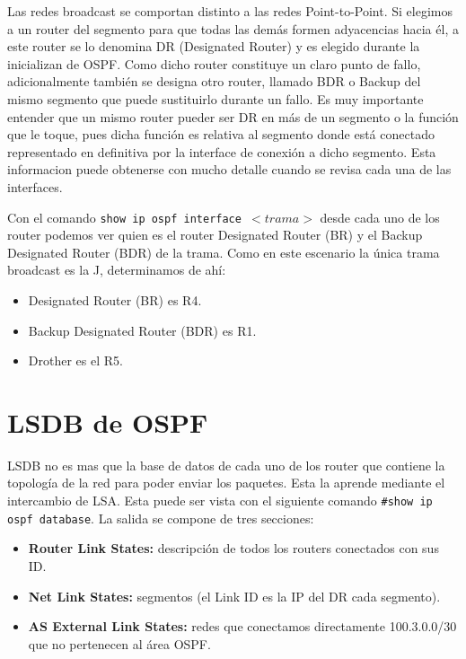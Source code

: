 \documentclass{article}
\begin{document}
Las redes broadcast se comportan distinto a las redes Point-to-Point. Si elegimos a un router del segmento para que todas las demás formen adyacencias hacia él, a este router se lo denomina DR (Designated Router) y es elegido durante la inicializan de OSPF. Como dicho router constituye un claro punto de fallo, adicionalmente también se designa otro router, llamado BDR o Backup del mismo segmento que puede sustituirlo durante un fallo.
Es muy importante entender que un mismo router pueder ser DR en más de un segmento o la función que le toque, pues dicha función es relativa al segmento donde está conectado  representado en definitiva por la interface de conexión a dicho segmento. Esta informacion puede obtenerse con mucho detalle cuando se revisa cada una de las interfaces.

Con el comando \texttt{show ip ospf interface $ <trama> $} desde cada uno de los router podemos ver quien es el router Designated Router (BR) y el Backup Designated Router (BDR) de la trama. Como en este escenario la única trama broadcast es la J, determinamos de ahí:

\begin{itemize}
	\item Designated Router (BR) es R4.
	\item Backup Designated Router (BDR) es R1.
	\item Drother es el R5.
\end{itemize}

\section{LSDB de OSPF}
LSDB no es mas que la base de datos de cada uno de los router que contiene la topología de la red para poder enviar los paquetes. Esta la aprende mediante el intercambio de LSA. Esta puede ser vista con el siguiente comando \texttt{\#show ip ospf database}. La salida se compone de tres secciones: 

\begin{itemize}
    \item \textbf{Router Link States:} descripción de todos los routers conectados con sus ID.
    \item \textbf{Net Link States:} segmentos (el Link ID es la IP del DR cada segmento).
    \item \textbf{AS External Link States:} redes que conectamos directamente 100.3.0.0/30 que no pertenecen al área OSPF.
\end{itemize}  
\end{document}
